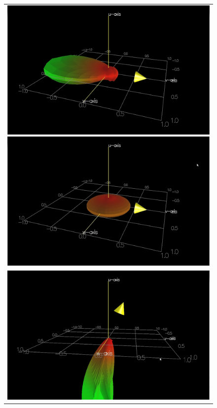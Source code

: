 \documentclass[11pt,a4paper]{report}
\begin{document}
\begin{figure}[h]
\begin{tabular}{c}
\includegraphics[scale=0.2]{images/strands0_colorR.jpg}
\includegraphics[scale=0.2]{images/strands1_colorR.jpg} \\
\includegraphics[scale=0.2]{images/theta67_strands0_colorR.jpeg}

\end{tabular}
\end{figure}
\end{document}

